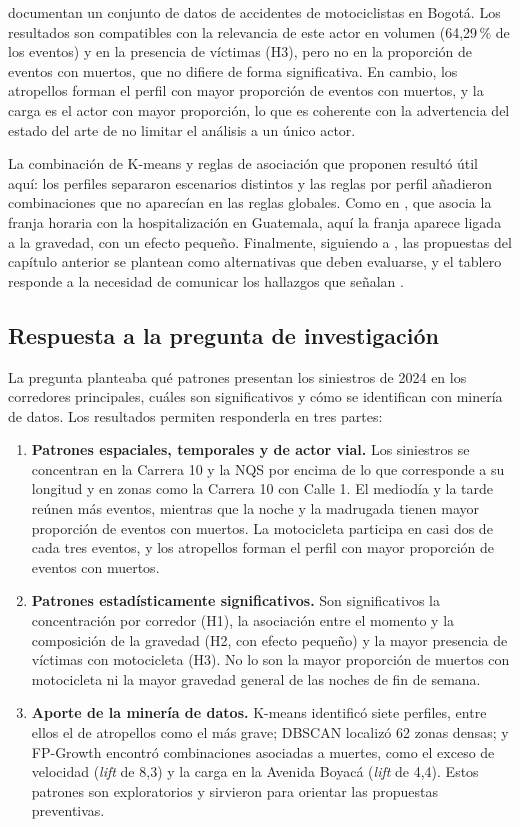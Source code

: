 \documentclass[12pt,letterpaper]{article}
\begin{document}
\citet{ospina2022} documentan un conjunto de datos de accidentes de
motociclistas en Bogotá. Los resultados son compatibles con la
relevancia de este actor en volumen
(64,29\,\% de los eventos) y en la presencia de víctimas (H3), pero no en
la proporción de eventos con muertos, que no difiere de forma
significativa. En cambio, los atropellos forman el perfil con mayor
proporción de eventos con muertos, y la carga es el actor con mayor
proporción, lo que es coherente con la advertencia del
estado del arte de no limitar el análisis a un único actor.

La combinación de K-means y reglas de asociación que proponen
\citet{sathiyanathan2024} resultó útil aquí: los perfiles
separaron escenarios distintos y las reglas por perfil añadieron
combinaciones que no aparecían en las reglas globales. Como en
\citet{davila2024}, que asocia la franja horaria con la hospitalización
en Guatemala, aquí la franja aparece ligada a la gravedad, con un
efecto pequeño. Finalmente, siguiendo a \citet{job2022}, las propuestas
del capítulo anterior se plantean como alternativas que deben evaluarse,
y el tablero responde a la necesidad de comunicar los hallazgos que
señalan \citet{ordonez2025}.

\subsection{Respuesta a la pregunta de investigación}

La pregunta planteaba qué patrones presentan los siniestros de 2024 en
los corredores principales, cuáles son significativos y cómo se
identifican con minería de datos. Los resultados permiten responderla en
tres partes:

\begin{enumerate}[leftmargin=*,itemsep=2pt]
\item \textbf{Patrones espaciales, temporales y de actor vial.} Los
siniestros se concentran en la Carrera 10 y la NQS por encima de lo que
corresponde a su longitud y en zonas como la Carrera 10 con Calle 1. El
mediodía y la tarde reúnen más eventos, mientras que la noche y la
madrugada tienen mayor proporción de eventos con muertos. La motocicleta
participa en casi dos de cada tres eventos, y los atropellos forman el
perfil con mayor proporción de eventos con muertos.
\item \textbf{Patrones estadísticamente significativos.} Son
significativos la concentración por corredor (H1), la asociación entre
el momento y la composición de la gravedad (H2, con efecto pequeño) y la
mayor presencia de víctimas con motocicleta (H3). No lo son la mayor
proporción de muertos con motocicleta ni la mayor gravedad general de
las noches de fin de semana.
\item \textbf{Aporte de la minería de datos.} K-means identificó siete
perfiles, entre ellos el de atropellos como el más grave; DBSCAN
localizó 62 zonas densas; y FP-Growth encontró combinaciones asociadas
a muertes, como el exceso de velocidad (\emph{lift} de 8,3) y la carga
en la Avenida Boyacá (\emph{lift} de 4,4). Estos patrones son
exploratorios y sirvieron para orientar las propuestas preventivas.
\end{enumerate}
\end{document}

